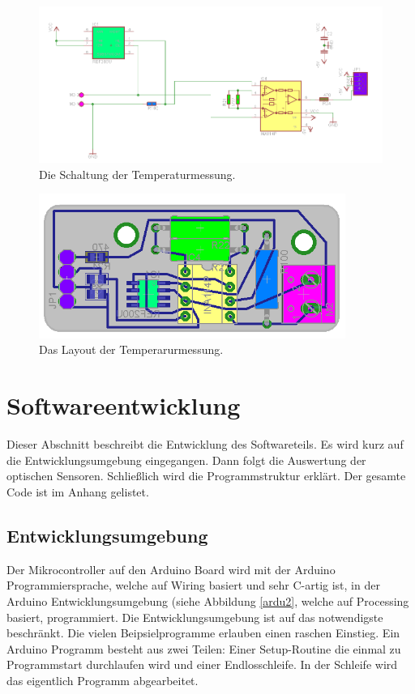 \documentclass[a4paper,bibtotoc,oneside]{scrbook}
\begin{document}
\begin{figure}[htbp]
\centering
\includegraphics[width=125mm]{img/tmess.png}
\caption{Die Schaltung der Temperaturmessung.}\label{tmess}
\end{figure}

\begin{figure}[htbp]
\centering
\includegraphics[width=100mm]{img/tmess2.png}
\caption{Das Layout der Temperarurmessung.}\label{tmess2}
\end{figure}






\section{Softwareentwicklung}\thispagestyle{empty}
Dieser Abschnitt beschreibt die Entwicklung des Softwareteils. Es wird kurz auf die Entwicklungsumgebung eingegangen. Dann folgt die Auswertung der optischen Sensoren. Schließlich wird die Programmstruktur erklärt. Der gesamte Code ist im Anhang gelistet.

\subsection{Entwicklungsumgebung}\thispagestyle{empty}
Der Mikrocontroller auf den Arduino Board wird mit der Arduino Programmiersprache, welche auf Wiring basiert und sehr C-artig ist, in der Arduino Entwicklungsumgebung (siehe Abbildung \ref{ardu2}, welche auf Processing basiert, programmiert. Die Entwicklungsumgebung ist auf das notwendigste beschränkt. Die vielen Beipsielprogramme erlauben einen raschen Einstieg.
Ein Arduino Programm besteht aus zwei Teilen: Einer Setup-Routine die einmal zu Programmstart durchlaufen wird und einer Endlosschleife. In der Schleife wird das eigentlich Programm abgearbeitet. 
\end{document}
